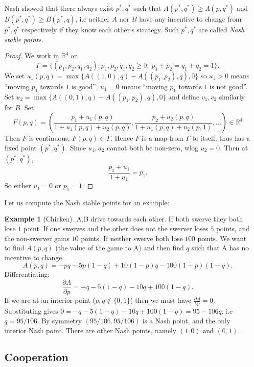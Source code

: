 \documentclass[a4paper, 10pt, twocolumn]{amsart}
\theoremstyle{definition}
\newtheorem*{example}{Example}
\newcommand{\bb}[1]{\mathbb{#1}}
\newcommand{\1}{\mathbbm{1}}
\newcommand{\pdv}[2]{\frac{\partial #1}{\partial #2}}
\begin{document}
Nash showed that there always exist $p^\ast,q^\ast$ such that $A(p^\ast,q^\ast) \ge A(p,q^\ast)$ and $B(p^\ast,q^\ast) \ge B(p^\ast,q)$, i.e neither $A$ nor $B$ have any incentive to change from $p^\ast,q^\ast$ respectively if they know each other's strategy. Such $p^\ast,q^\ast$ are called \textit{Nash stable points}.

\begin{proof}
    We work in $\bb{R}^4$ on \[\Gamma = \{(p_1,p_2,q_1,q_2) : p_1,p_2,q_1,q_2\ge 0, \ p_1+p_2=q_1+q_2=1\}.\]
    We set $u_1(p,q) = \max\{A((1,0),q)-A((p_1,p_2),q),0\}$ so $u_1>0$ means ``moving $p_1$ towards $1$ is good'', $u_1=0$ means ``moving $p_1$ towards $1$ is not good''.\\

    Set $u_2 = \max\{A((0,1),q)-A((p_1,p_2),q),0\}$ and define $v_1,v_2$ similarly for $B$. Set \[F(p,q) = \left(\frac{p_1+u_1(p,q)}{1+u_1(p,q)+u_2(p,q)},\frac{p_2+u_2(p,q)}{1+u_1(p,q)+u_2(p,1)},\ldots \right) \in \bb{R}^4\]
    Then $F$ is continuous, $F(p,q) \in \Gamma$. Hence $F$ is a map from $\Gamma$ to itself, thus has a fixed point $(p^\ast,q^\ast)$. Since $u_1,u_2$ cannot both be non-zero, wlog $u_2=0$. Then at $(p^\ast,q^\ast)$, \[\frac{p_1+u_1}{1+u_1} = p_1.\]
    So either $u_1=0$ or $p_1=1$.  
\end{proof}





Let us compute the Nash stable points for an example: 

\begin{example}[Chicken]
    A,B drive towards each other. If both swerve they both lose $1$ point. If one swerves and the other does not the swerver loses $5$ points, and the non-swerver gains $10$ points. If neither swerve both lose $100$ points. We want to find $A(p,q)$ (the value of the game to A) and then find $q$ such that A has no incentive to change. \[A(p,q) = -pq-5p(1-q)+10(1-p)q-100(1-p)(1-q).\]
    Differentiating: \[\pdv{A}{p} = -q-5(1-q)-10q+100(1-q).\]
    If we are at an interior point ($p,q \not \in \{0,1\}$) then we must have $\pdv{A}{p} = 0$. Substituting gives $0 = -q-5(1-q)-10q+100(1-q) = 95-106q$, i.e $q = 95/106$. By symmetry $(95/106,95/106)$ is a Nash point, and the only interior Nash point. There are other Nash points, namely $(1,0)$ and $(0,1)$. 
\end{example}

\subsection*{Cooperation}
\end{document}
